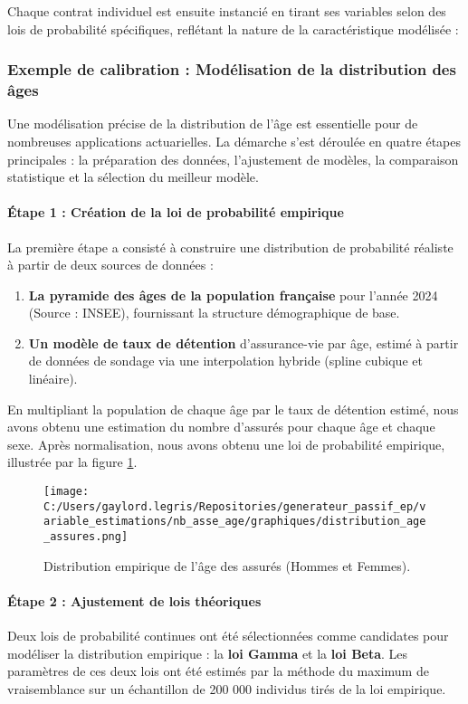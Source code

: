 Chaque contrat individuel est ensuite instancié en tirant ses variables selon des lois de probabilité spécifiques, reflétant la nature de la caractéristique modélisée :
\subsubsection{Exemple de calibration : Modélisation de la distribution des âges}
Une modélisation précise de la distribution de l'âge est essentielle pour de nombreuses applications actuarielles. La démarche s'est déroulée en quatre étapes principales : la préparation des données, l'ajustement de modèles, la comparaison statistique et la sélection du meilleur modèle.

\paragraph{Étape 1 : Création de la loi de probabilité empirique}
La première étape a consisté à construire une distribution de probabilité réaliste à partir de deux sources de données :
\begin{enumerate}
\item \textbf{La pyramide des âges de la population française} pour l'année 2024 (Source : INSEE), fournissant la structure démographique de base.
\item \textbf{Un modèle de taux de détention} d'assurance-vie par âge, estimé à partir de données de sondage via une interpolation hybride (spline cubique et linéaire).
\end{enumerate}
En multipliant la population de chaque âge par le taux de détention estimé, nous avons obtenu une estimation du nombre d'assurés pour chaque âge et chaque sexe. Après normalisation, nous avons obtenu une loi de probabilité empirique, illustrée par la figure \ref{fig:empirique}.

\begin{figure}[H]
\centering
\texttt{[image: C:/Users/gaylord.legris/Repositories/generateur\_passif\_ep/variable\_estimations/nb\_asse\_age/graphiques/distribution\_age\_assures.png]}
\caption{Distribution empirique de l'âge des assurés (Hommes et Femmes).}
\label{fig:empirique}
\end{figure}

\paragraph{Étape 2 : Ajustement de lois théoriques}
Deux lois de probabilité continues ont été sélectionnées comme candidates pour modéliser la distribution empirique : la \textbf{loi Gamma} et la \textbf{loi Beta}. Les paramètres de ces deux lois ont été estimés par la méthode du maximum de vraisemblance sur un échantillon de 200 000 individus tirés de la loi empirique.

